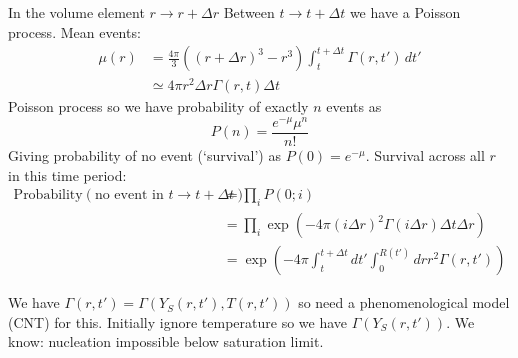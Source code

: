 \documentclass[12pt]{report}
\begin{document}
In the volume element $r \to r + \Delta r$ Between $t \to t+\Delta t$ we have a Poisson process.
Mean events:
\begin{equation}
  \begin{aligned}
    \mu(r) &= \frac{4\pi}{3} ( (r+\Delta r)^3 - r^3)
    \int_t^{t+\Delta t} \Gamma(r,t') \, dt' \\
    &\simeq
    4\pi r^2 \Delta r \Gamma(r, t) \Delta t
  \end{aligned}
\end{equation}
Poisson process so we have probability of exactly $n$ events as
\begin{equation}
  P(n) = \frac{e^{-\mu} \mu^n}{n!}
\end{equation}
Giving probability of no event (`survival') as $P(0) = e^{-\mu}$.
Survival across all $r$ in this time period:
\begin{equation}
  \begin{aligned}
  \textrm{Probability}\left( \textrm{no event in } t \to t + \Delta t \right)
  &= \prod_i P(0;i) \\
  &= \prod_i \exp{\left(-4\pi (i\Delta r)^2 \Gamma(i\Delta r) \Delta t \Delta r\right)} \\
  &= \exp{\left(
    -4\pi \int_t^{t+\Delta t} dt' \int_0^{R(t')} dr r^2 \Gamma(r, t')
    \right)}
  \end{aligned}
\end{equation}

We have $\Gamma(r,t') = \Gamma(Y_S(r,t'), T(r,t'))$ so need a phenomenological model (CNT) for this.
Initially ignore temperature so we have $\Gamma(Y_S(r,t'))$.
We know: nucleation impossible below saturation limit.
\end{document}

